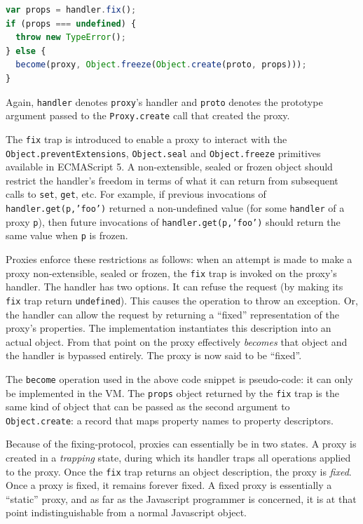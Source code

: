 \documentclass{sig-alternate}
\begin{document}
\begin{lstlisting}[language=javascript]
var props = handler.fix();
if (props === undefined) {
  throw new TypeError();
} else {
  become(proxy, Object.freeze(Object.create(proto, props)));
}
\end{lstlisting}

Again, \texttt{handler} denotes \texttt{proxy}'s handler and \texttt{proto} denotes the prototype argument passed to the \texttt{Proxy.create} call that created the proxy.

The \texttt{fix} trap is introduced to enable a proxy to interact with the \texttt{Object.preventExtensions}, \texttt{Object.seal} and \texttt{Object.freeze} primitives available in ECMAScript 5. A non-extensible, sealed or frozen object should restrict the handler's freedom in terms of what it can return from subsequent calls to \texttt{set}, \texttt{get}, etc. For example, if previous invocations of \texttt{handler.get(p,'foo')} returned a non-undefined value (for some \texttt{handler} of a proxy \texttt{p}), then future invocations of \texttt{handler.get(p,'foo')} should return the same value when \texttt{p} is frozen.

Proxies enforce these restrictions as follows: when an attempt is made to make a proxy non-extensible, sealed or frozen, the \texttt{fix} trap is invoked on the proxy's handler. The handler has two options. It can refuse the request (by making its \texttt{fix} trap return \texttt{undefined}). This causes the operation to throw an exception. Or, the handler can allow the request by returning a ``fixed'' representation of the proxy's properties. The implementation instantiates this description into an actual object. From that point on the proxy effectively \emph{becomes} that object and the handler is bypassed entirely. The proxy is now said to be ``fixed''.

The \texttt{become} operation used in the above code snippet is pseudo-code: it can only be implemented in the VM. The \texttt{props} object returned by the \texttt{fix} trap is the same kind of object that can be passed as the second argument to \texttt{Object.create}: a record that maps property names to property descriptors.

Because of the fixing-protocol, proxies can essentially be in two states. A proxy is created in a \emph{trapping} state, during which its handler traps all operations applied to the proxy. Once the \texttt{fix} trap returns an object description, the proxy is \emph{fixed}. Once a proxy is fixed, it remains forever fixed. A fixed proxy is essentially a ``static'' proxy, and as far as the Javascript programmer is concerned, it is at that point indistinguishable from a normal Javascript object.
\end{document}
